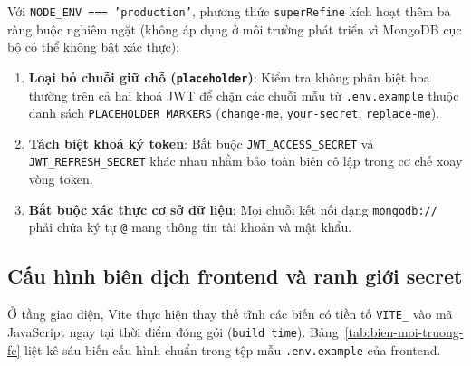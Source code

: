 Với \texttt{NODE\_\allowbreak{}ENV === 'production'}, phương thức \texttt{superRefine} kích hoạt thêm ba ràng buộc nghiêm ngặt (không áp dụng ở môi trường phát triển vì MongoDB cục bộ có thể không bật xác thực):
\begin{enumerate}
    \item \textbf{Loại bỏ chuỗi giữ chỗ (\texttt{placeholder})}: Kiểm tra không phân biệt hoa thường trên cả hai khoá JWT để chặn các chuỗi mẫu từ \texttt{.\allowbreak{}env.\allowbreak{}example} thuộc danh sách \texttt{PLACEHOLDER\_\allowbreak{}MARKERS} (\texttt{change-\allowbreak{}me}, \texttt{your-\allowbreak{}secret}, \texttt{replace-\allowbreak{}me}).
    \item \textbf{Tách biệt khoá ký token}: Bắt buộc \texttt{JWT\_\allowbreak{}ACCESS\_\allowbreak{}SECRET} và \texttt{JWT\_\allowbreak{}REFRESH\_\allowbreak{}SECRET} khác nhau nhằm bảo toàn biên cô lập trong cơ chế xoay vòng token.
    \item \textbf{Bắt buộc xác thực cơ sở dữ liệu}: Mọi chuỗi kết nối dạng \texttt{mongodb:\allowbreak{}/\allowbreak{}/\allowbreak{}} phải chứa ký tự \texttt{@\allowbreak{}} mang thông tin tài khoản và mật khẩu.
\end{enumerate}

\subsection{Cấu hình biên dịch frontend và ranh giới secret}
\label{subsec:cau-hinh-fe-secret}

Ở tầng giao diện, Vite thực hiện thay thế tĩnh các biến có tiền tố \texttt{VITE\_\allowbreak{}} vào mã JavaScript ngay tại thời điểm đóng gói (\texttt{build time}). Bảng~\ref{tab:bien-moi-truong-fe} liệt kê sáu biến cấu hình chuẩn trong tệp mẫu \texttt{.\allowbreak{}env.\allowbreak{}example} của frontend.

